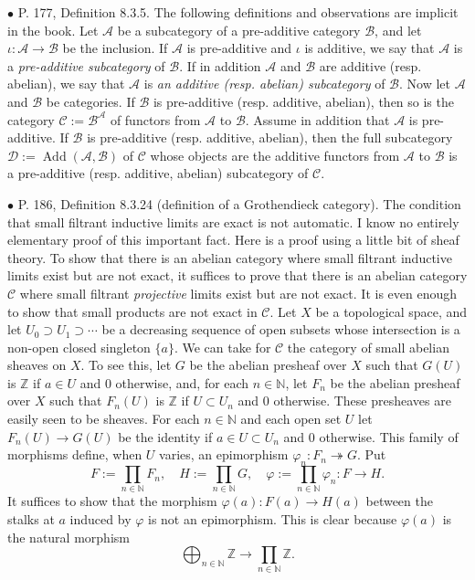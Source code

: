 \documentclass[12pt]{article}
\theoremstyle{remark}
\newcommand{\bu}{\bullet}
\newcommand{\n}{\noindent}
\newcommand{\cc}{\mathcal}
\newcommand{\C}{\mathcal C}
\newcommand{\epi}{\twoheadrightarrow}
\newcommand{\p}{\varphi}
\DeclareMathOperator{\Ad}{Add}
\begin{document}

\n$\bu$ P. 177, Definition 8.3.5. The following definitions and observations are implicit in the book. Let $\cc A$ be a subcategory of a pre-additive category $\cc B$, and let $\iota:\cc A\to \cc B$ be the inclusion. If $\cc A$ is pre-additive and $\iota$ is additive, we say that $\cc A$ is a {\em pre-additive subcategory} of $\cc B$. If in addition $\cc A$ and $\cc B$ are additive (resp. abelian), we say that $\cc A$ is {\em an additive (resp. abelian) subcategory} of $\cc B$. Now let $\cc A$ and $\cc B$ be categories. If $\cc B$ is pre-additive (resp. additive, abelian), then so is the category $\cc C:=\cc B^\cc A$ of functors from $\cc A$ to $\cc B$. Assume in addition that $\cc A$ is pre-additive. If $\cc B$ is pre-additive (resp. additive, abelian), then the full subcategory $\cc D:=\Ad(\cc A,\cc B)$ of $\cc C$ whose objects are the additive functors from $\cc A$ to $\cc B$ is a pre-additive (resp. additive, abelian) subcategory of $\cc C$. 


\n$\bu$ P. 186, Definition 8.3.24 (definition of a Grothendieck category). The condition that small filtrant inductive limits are exact is not automatic. I know no entirely elementary proof of this important fact. Here is a proof using a little bit of sheaf theory. To show that there is an abelian category where small filtrant inductive limits exist but are not exact, it suffices to prove that there is an abelian category $\C$ where small filtrant {\em projective} limits exist but are not exact. It is even enough to show that small products are not exact in $\C$. Let $X$ be a topological space, and let $U_0\supset U_1\supset\cdots$ be a decreasing sequence of open subsets whose intersection is a non-open closed singleton $\{a\}$. We can take for $\C$ the category of small abelian sheaves on $X$. To see this, let $G$ be the abelian presheaf over $X$ such that $G(U)$ is $\mathbb Z$ if $a\in U$ and 0 otherwise, and, for each $n\in\mathbb N$, let $F_n$ be the abelian presheaf over $X$ such that $F_n(U)$ is $\mathbb Z$ if $U\subset U_n$ and 0 otherwise. These presheaves are easily seen to be sheaves. For each $n\in\mathbb N$ and each open set $U$ let $F_n(U)\to G(U)$ be the identity if $a\in U\subset U_n$ and 0 otherwise. This family of morphisms define, when $U$ varies, an epimorphism $\p_n:F_n\epi G$. Put 
$$
F:=\prod_{n\in\mathbb N}F_n,\quad H:=\prod_{n\in\mathbb N}G,\quad\p:=\prod_{n\in\mathbb N}\p_n:F\to H.
$$ 
It suffices to show that the morphism $\p(a):F(a)\to H(a)$ between the stalks at $a$ induced by $\p$ is not an epimorphism. This is clear because $\p(a)$ is the natural morphism 
$$
\bigoplus_{n\in\mathbb N}\mathbb Z\to\prod_{n\in\mathbb N}\mathbb Z.
$$ 
\end{document}
